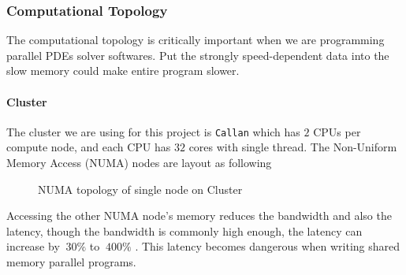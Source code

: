 \subsubsection{Computational Topology}
The computational topology is critically important when we are programming parallel PDEs solver softwares.
Put the strongly speed-dependent data into the slow memory could make entire program slower.

\paragraph{Cluster}
The cluster we are using for this project is \texttt{Callan} \cite{Callan_TCD} which has 
$2$ CPUs per compute node, and each CPU has $32$ cores with single thread. 
The Non-Uniform Memory Access (NUMA) nodes are layout as following 
\begin{figure}[htbp]
  \centering
  \caption{NUMA topology of single node on Cluster}
  \label{FIG_Topology_Callan}
\end{figure}
Accessing the other NUMA node's memory reduces the bandwidth and also the latency,
though the bandwidth is commonly high enough, the latency can increase by 
$~30\%$ to $~400\%$ \cite{NUMA_Latency_TCD}. 
This latency becomes dangerous when writing shared memory parallel programs.


